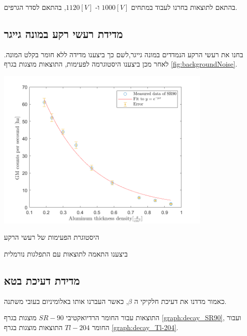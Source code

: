 \documentclass{article}
\begin{document}
בהתאם לתוצאות בחרנו לעבוד במתחים 
$1000[V]$
ו-
$1120[V]$,
בהתאם לסדר הגרפים.

\subsection{
מדידת רעשי רקע במונה גייגר
}
בחנו את רעשי הרקע הנמדדים במונה גייגר,לשם כך ביצענו מדידה ללא חומר בקלט המונה. לאחר מכן ביצענו היסטוגרמה לפעימות, התוצאות מוצגות בגרף
\ref{fig:backgroundNoise}.
\begin{graph}[ht!]
    \centering
    \includegraphics[width=0.79\textwidth]{SR90.png}
    \caption{
    היסטוגרת הפעימות של רעשי הרקע
    }
    \label{graph:backgroundNoise}
\end{graph}

ביצענו התאמה לתוצאות עם התפלגות נורמלית 
\subsection{
מדידת דעיכת בטא
}

כאמור מדדנו את דעיכת חלקיקי ה
$\beta$,
כאשר העברנו אותו באלומיניום בעובי משתנה.

התוצאות עבור החומר הרדיואקטיבי
$SR-90$
מוצגות בגרף 
\ref{graph:decay_SR90},
ועבור החומר
$Tl-204$
התוצאות מוצגות בגרף
\ref{graph:decay_Tl-204}.
\end{document}
